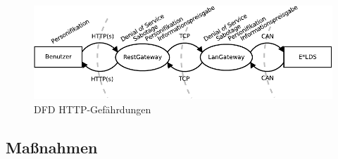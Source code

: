 \documentclass[11pt,a4paper]{report}
\begin{document}
\begin{figure}[htbp]
\centering
\includegraphics[scale=1]{images/dfd_http_threat.pdf}
\caption{DFD HTTP-Gefährdungen}
\label{fig:dfd_http_threat}
\end{figure}

\subsection{Maßnahmen}
\end{document}
